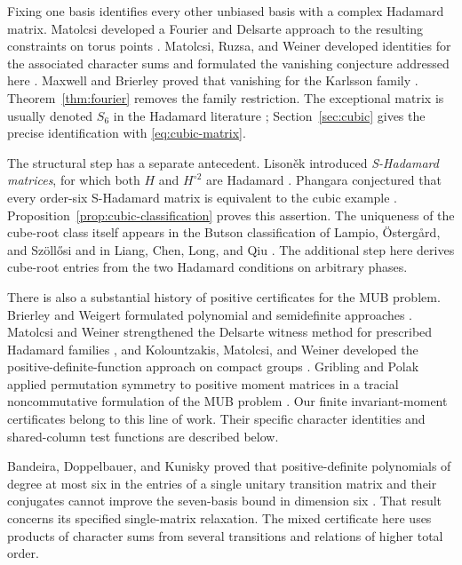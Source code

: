 \documentclass[11pt]{article}
\begin{document}
Fixing one basis identifies every other unbiased basis with a complex
Hadamard matrix. Matolcsi developed a Fourier and Delsarte approach to the
resulting constraints on torus points \cite{Matolcsi2012}. Matolcsi,
Ruzsa, and Weiner developed identities for the associated character sums
and formulated the vanishing conjecture addressed here
\cite{MatolcsiRuzsaWeiner2013}. Maxwell and Brierley proved that vanishing
for the Karlsson family \cite[Theorem~4.1]{MaxwellBrierley2015}.
Theorem~\ref{thm:fourier} removes the family restriction. The exceptional
matrix is usually denoted $S_6$ in the Hadamard literature
\cite[Section~5.6.4]{TadejZyczkowski2006}; Section~\ref{sec:cubic} gives
the precise identification with \eqref{eq:cubic-matrix}.

The structural step has a separate antecedent. Lison\v{e}k introduced
\emph{S-Hadamard matrices}, for which both $H$ and $H^{\circ2}$ are
Hadamard \cite[Definition~2.1]{Lisonek2019}. Phangara conjectured that
every order-six S-Hadamard matrix is equivalent to the cubic example
\cite[Conjecture~3.1.6]{Phangara2026}. Proposition~\ref{prop:cubic-classification}
proves this assertion. The uniqueness of the cube-root class itself
appears in the Butson classification of Lampio, \"Osterg\aa rd, and
Sz\"oll\H{o}si \cite[Theorem~4.1 and Table~2]{LampioOstergardSzollosi2020}
and in Liang, Chen, Long, and Qiu \cite[Lemma~10]{LiangChenLongQiu2021}.
The additional step here derives cube-root entries from the two
Hadamard conditions on arbitrary phases.

There is also a substantial history of positive certificates for the
MUB problem. Brierley and Weigert formulated polynomial and semidefinite
approaches \cite{BrierleyWeigert2010SDP}. Matolcsi and Weiner strengthened
the Delsarte witness method for prescribed Hadamard families
\cite{MatolcsiWeiner2015}, and Kolountzakis, Matolcsi, and Weiner developed
the positive-definite-function approach on compact groups
\cite{KolountzakisMatolcsiWeiner2018}. Gribling and Polak applied
permutation symmetry to positive moment matrices in a tracial
noncommutative formulation of the MUB problem
\cite{GriblingPolak2024}. Our finite invariant-moment certificates belong
to this line of work. Their specific character identities and
shared-column test functions are described below.

Bandeira, Doppelbauer, and Kunisky proved that positive-definite
polynomials of degree at most six in the entries of a single unitary
transition matrix and their conjugates
cannot improve the seven-basis bound in dimension six
\cite[Theorem~1.10]{BandeiraDoppelbauerKunisky2022}.
That result concerns its specified single-matrix relaxation. The mixed
certificate here uses products of character sums from several transitions
and relations of higher total order.
\end{document}
